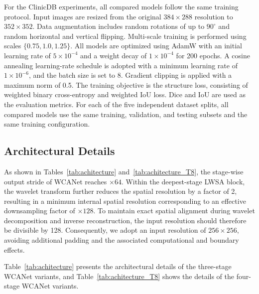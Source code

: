 \documentclass[a4paper,fleqn]{cas-dc}
\begin{document}
{\color{blue}
For the ClinicDB experiments, all compared models follow the same training
protocol. Input images are resized from the original $384\times288$ resolution
to $352\times352$. Data augmentation includes random rotations of up to
$90^\circ$ and random horizontal and vertical flipping. Multi-scale training
is performed using scales $\{0.75, 1.0, 1.25\}$.
All models are optimized using AdamW with an initial learning rate of
$5\times10^{-4}$ and a weight decay of $1\times10^{-4}$ for 200 epochs.
A cosine annealing learning-rate schedule is adopted with a minimum learning
rate of $1\times10^{-6}$, and the batch size is set to 8. Gradient clipping
is applied with a maximum norm of 0.5.
The training objective is the structure loss, consisting of weighted binary
cross-entropy and weighted IoU loss. Dice and IoU are used as the evaluation
metrics. For each of the five independent dataset splits, all compared models
use the same training, validation, and testing subsets and the same training
configuration.
}


\subsection{Architectural Details}


{\color{blue}
As shown in Tables~\ref{tab:achitecture} and~\ref{tab:achitecture_T8},
the stage-wise output stride of WCANet reaches $\times64$.
Within the deepest-stage LWSA block, the wavelet transform further reduces
the spatial resolution by a factor of 2, resulting in a minimum internal
spatial resolution corresponding to an effective downsampling factor of
$\times128$. To maintain exact spatial alignment during wavelet decomposition
and inverse reconstruction, the input resolution should therefore be divisible
by 128. Consequently, we adopt an input resolution of $256\times256$, avoiding
additional padding and the associated computational and boundary effects.
}

Table~\ref{tab:achitecture} presents the architectural details of the three-stage WCANet variants, and Table~\ref{tab:achitecture_T8} shows the details of the four-stage WCANet variants.
\end{document}
